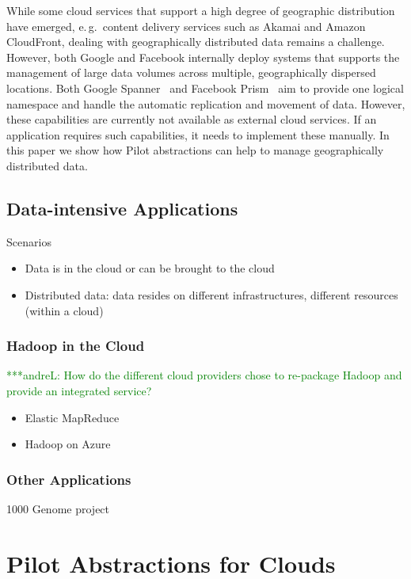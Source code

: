 \documentclass[times]{cpeauth}
\newcommand{\alnote}[1]{ {\textcolor{green} { ***andreL: #1 }}}
\newcommand{\alnote}[1]{}
\newcommand{\pilot}{Pilot\xspace}
\begin{document}
While some cloud services that support a high degree of geographic 
distribution have emerged, e.\,g.\ content delivery services such as Akamai 
and Amazon CloudFront, dealing with geographically distributed data remains a 
challenge. However, both Google and Facebook internally deploy systems that 
supports the management of large data volumes across multiple, geographically
dispersed locations. Both Google Spanner~\cite{dean09} and Facebook 
Prism~\cite{Metz12} aim to provide one logical namespace and handle the 
automatic replication and movement of data. However, these capabilities are 
currently not available as external cloud services. If an application requires 
such capabilities, it needs to implement these manually. In this paper we show 
how \pilot abstractions can help to manage geographically distributed data.


\subsection{Data-intensive Applications}

Scenarios
\begin{itemize}
	\item Data is in the cloud or can be brought to the cloud
	\item Distributed data: data resides on different infrastructures, different resources (within a cloud)
\end{itemize}


\subsubsection{Hadoop in the Cloud}

\alnote{How do the different cloud providers chose to re-package Hadoop and 
provide an integrated service?}

\begin{itemize}
	\item Elastic MapReduce
	\item Hadoop on Azure
\end{itemize}

\subsubsection{Other Applications}

1000 Genome project





\section{Pilot Abstractions for Clouds}
\end{document}
